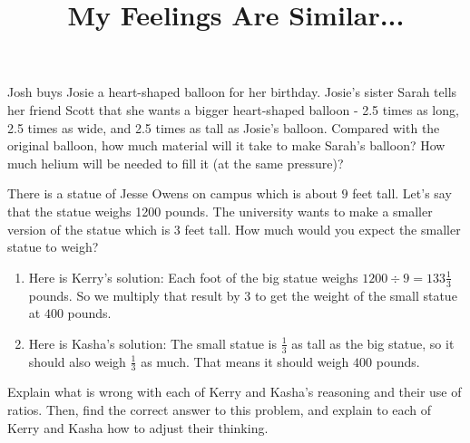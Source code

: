 \documentclass[nooutcomes, noauthor, handout]{ximera}
\begin{document}
\title{My Feelings Are Similar...}
\begin{abstract}
\end{abstract}
\maketitle



\begin{problem}
Josh buys Josie a heart-shaped balloon for her birthday.  Josie's sister Sarah tells her friend Scott that she wants a bigger heart-shaped balloon - 2.5 times as long, 2.5 times as wide, and 2.5 times as tall as Josie's balloon.  Compared with the original balloon, how much material will it take to make Sarah's balloon?  How much helium will be needed to fill it (at the same pressure)?

\end{problem}

\begin{problem}
There is a statue of Jesse Owens on campus which is about $9$ feet tall. Let's say that the statue weighs 1200 pounds. The university wants to make a smaller version of the statue which is $3$ feet tall. How much would you expect the smaller statue to weigh?


\begin{enumerate}
    \item Here is Kerry's solution: Each foot of the big statue weighs $1200 \div 9 = 133 \frac{1}{3}$ pounds.  So we multiply that result by $3$ to get the weight of the small statue at $400$ pounds.
    \item Here is Kasha's solution: The small statue is $\frac{1}{3}$ as tall as the big statue, so it should also weigh $\frac{1}{3}$ as much. That means it should weigh $400$ pounds.
\end{enumerate}

Explain what is wrong with each of Kerry and Kasha's reasoning and their use of ratios.  Then, find the correct answer to this problem, and explain to each of Kerry and Kasha how to adjust their thinking.
\end{problem}
\end{document}
